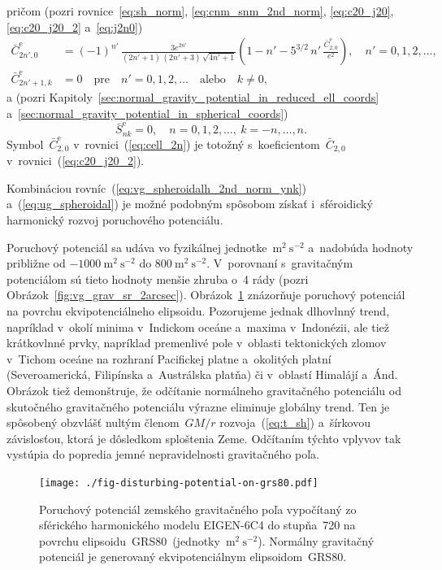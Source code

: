 \documentclass[a4paper, 12pt]{book}
\begin{document}
%
pričom (pozri rovnice~\ref{eq:sh_norm}, \ref{eq:cnm_snm_2nd_norm}, 
\ref{eq:c20_j20}, \ref{eq:c20_j20_2} a~\ref{eq:j2n0})
%
\begin{align}
\label{eq:cell_2n}
\bar{C}^\mathrm{e}_{2n',0} &= (-1)^{n'} \, \frac{3e^{2n'}}{(2n' + 1) \, (2n' 
+ 3) \, \sqrt{4n' + 1}} \left( 1 - n' - 5^{3 \slash 2} \, n' \, 
\frac{\bar{C}^\mathrm{e}_{2,0}}{e^2} \right){,} \quad n' = 0, 1, 2,\dots{,}\\
%
\bar{C}^\mathrm{e}_{2n' + 1,k} &= 0 \quad \textrm{pre} \quad n' = 0, 1, 2,\dots 
\quad \mathrm{alebo} \quad k \neq 0{,}
\end{align}
%
a (pozri Kapitoly~\ref{sec:normal_gravity_potential_in_reduced_ell_coords} 
a~\ref{sec:normal_gravity_potential_in_spherical_coords})
%
\begin{equation}
\bar{S}^\mathrm{e}_{nk} = 0{,} \quad n = 0, 1, 2,\dots, \ k = -n, \dots, n{.}
\end{equation}
%
Symbol~$\bar{C}^\mathrm{e}_{2,0}$ v~rovnici~(\ref{eq:cell_2n}) je totožný 
s~koeficientom~$\bar{C}_{2,0}$ v~rovnici~(\ref{eq:c20_j20_2}).

Kombináciou rovníc~(\ref{eq:vg_spheroidalh_2nd_norm_ynk}) 
a~(\ref{eq:ug_spheroidal}) je možné podobným spôsobom získať i~sféroidický 
harmonický rozvoj poruchového potenciálu.

Poruchový potenciál sa udáva vo fyzikálnej jednotke~$\mathrm{m}^2 
\ \mathrm{s}^{-2}$ a~nadobúda hodnoty približne od $-1000\ \mathrm{m}^2 
\ \mathrm{s}^{-2}$ do $800 \ \mathrm{m}^2 \ \mathrm{s}^{-2}$.  V~porovnaní 
s~gravitačným potenciálom sú tieto hodnoty menšie zhruba o~4 rády (pozri 
Obrázok~\ref{fig:vg_grav_sr_2arcsec}).  
Obrázok~\ref{fig:disturbing_potential_on_grs80} znázorňuje poruchový potenciál 
na povrchu ekvipotenciálneho elipsoidu.  Pozorujeme jednak dlhovlnný trend, 
napríklad v~okolí minima v~Indickom oceáne a~maxima v~Indonézii, ale tiež 
krátkovlnné prvky, napríklad premenlivé pole v~oblasti tektonických zlomov 
v~Tichom oceáne na rozhraní Pacifickej platne a~okolitých platní 
(Severoamerická, Filipínska a~Austrálska platňa) či v~oblastí Himalájí a~Ánd.  
Obrázok tiež demonštruje, že odčítanie normálneho gravitačného potenciálu od 
skutočného gravitačného potenciálu výrazne eliminuje globálny trend.  Ten je 
spôsobený obzvlášť nultým členom~$GM \slash r$ rozvoja~(\ref{eq:t_sh}) 
a~šírkovou závislosťou, ktorá je dôsledkom sploštenia Zeme.  Odčítaním týchto 
vplyvov tak vystúpia do popredia jemné nepravidelnosti gravitačného poľa.

\begin{figure}
\centering
\texttt{[image: ./fig-disturbing-potential-on-grs80.pdf]}
\caption{Poruchový potenciál zemského gravitačného poľa vypočítaný zo 
sférického harmonického modelu EIGEN-6C4 do stupňa~720 na povrchu 
elipsoidu~GRS80~(jednotky~$\mathrm{m}^2 \ \mathrm{s}^{-2}$).  Normálny 
gravitačný potenciál je generovaný ekvipotenciálnym elipsoidom~GRS80.}
\label{fig:disturbing_potential_on_grs80}
\end{figure}
\end{document}
